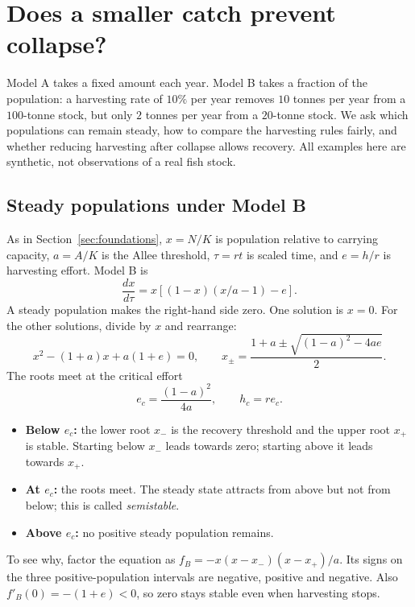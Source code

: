 \section{Does a smaller catch prevent collapse?}
\label{sec:wp02}

Model A takes a fixed amount each year. Model B takes a fraction of the population: a harvesting rate of $10\%$ per year removes $10$ tonnes per year from a $100$-tonne stock, but only $2$ tonnes per year from a $20$-tonne stock. We ask which populations can remain steady, how to compare the harvesting rules fairly, and whether reducing harvesting after collapse allows recovery. All examples here are synthetic, not observations of a real fish stock.

\subsection{Steady populations under Model B}
As in Section~\ref{sec:foundations}, $x=N/K$ is population relative to carrying capacity, $a=A/K$ is the Allee threshold, $\tau=rt$ is scaled time, and $e=h/r$ is harvesting effort. Model B is
\begin{equation}
\frac{dx}{d\tau}=x\left[(1-x)(x/a-1)-e\right].
\end{equation}
A steady population makes the right-hand side zero. One solution is $x=0$. For the other solutions, divide by $x$ and rearrange:
\begin{equation}
x^2-(1+a)x+a(1+e)=0,
\qquad x_\pm=\frac{1+a\pm\sqrt{(1-a)^2-4ae}}{2}.
\end{equation}
The roots meet at the critical effort
\begin{equation}
e_c=\frac{(1-a)^2}{4a},\qquad h_c=re_c.
\end{equation}
\begin{itemize}
\item \textbf{Below $e_c$:} the lower root $x_-$ is the recovery threshold and the upper root $x_+$ is stable. Starting below $x_-$ leads towards zero; starting above it leads towards $x_+$.
\item \textbf{At $e_c$:} the roots meet. The steady state attracts from above but not from below; this is called \emph{semistable}.
\item \textbf{Above $e_c$:} no positive steady population remains.
\end{itemize}
To see why, factor the equation as $f_B=-x(x-x_-)(x-x_+)/a$. Its signs on the three positive-population intervals are negative, positive and negative. Also $f'_B(0)=-(1+e)<0$, so zero stays stable even when harvesting stops.

